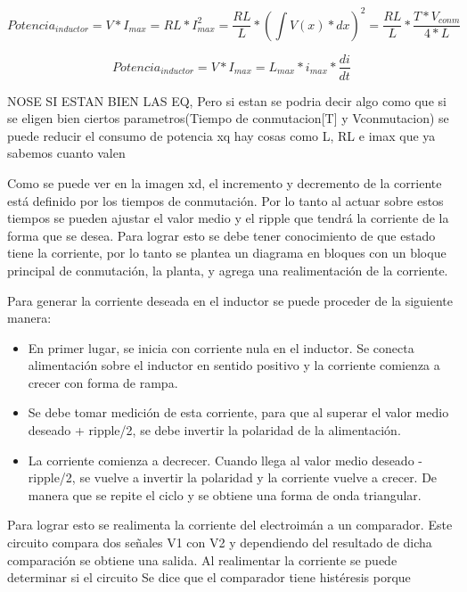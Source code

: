 \begin{equation}
Potencia_{inductor} = V*I_{max}=RL*I_{max}^2=\frac{RL}{L}*(\int{V(x)*dx})^2=\frac{RL}{L}*\frac{T*V_{conm}}{4*L}
\end{equation}

\begin{equation}
Potencia_{inductor} = V*I_{max}=L_{max}*i_{max}*\frac{di}{dt}
\end{equation}

NOSE SI ESTAN BIEN LAS EQ, Pero si estan se podria decir algo como que si se eligen bien ciertos parametros(Tiempo de conmutacion[T] y Vconmutacion) se puede reducir el consumo de potencia xq hay cosas como L, RL e imax que ya sabemos cuanto valen

Como se puede ver en la imagen xd, el incremento y decremento de la corriente está definido por los tiempos de conmutación. Por lo tanto al actuar sobre estos tiempos se pueden ajustar el valor medio y el ripple que tendrá la corriente de la forma que se desea. Para lograr esto se debe tener conocimiento de que estado tiene la corriente, por lo tanto se plantea un diagrama en bloques con un bloque principal de conmutación, la planta, y agrega una realimentación de la corriente.



Para generar la corriente deseada en el inductor se puede proceder de la siguiente manera:

\begin{itemize}
\item En primer lugar, se inicia con corriente nula en el inductor. Se conecta alimentación sobre el inductor en sentido positivo y la corriente comienza a crecer con forma de rampa.
\item Se debe tomar medición de esta corriente, para que al superar el valor medio deseado + ripple/2, se debe invertir la polaridad de la alimentación.
\item La corriente comienza a decrecer. Cuando llega al valor medio deseado - ripple/2, se vuelve a invertir la polaridad y la corriente vuelve a crecer. De manera que se repite el ciclo y se obtiene una forma de onda triangular.
\end{itemize}

Para lograr esto se realimenta la corriente del electroimán a un comparador. Este circuito compara dos señales V1 con V2 y dependiendo del resultado de dicha comparación se obtiene una salida. Al realimentar la corriente se puede determinar si el circuito 
Se dice que el comparador tiene histéresis porque



